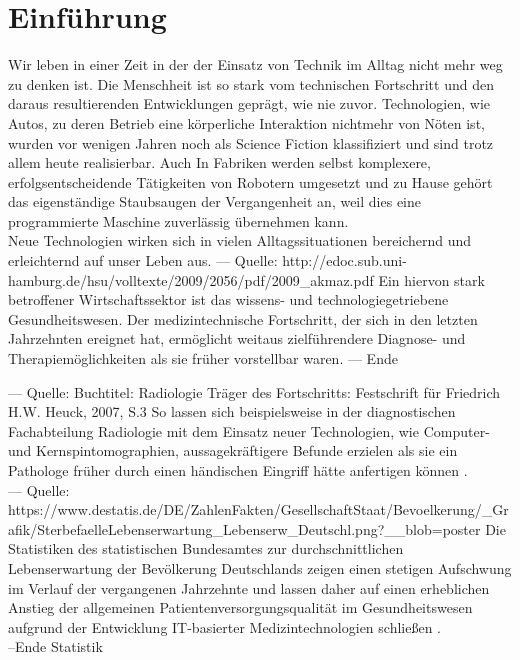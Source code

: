 \chapter{Einführung}
Wir leben in einer Zeit in der der Einsatz von Technik im Alltag nicht mehr weg zu denken ist. Die Menschheit ist so stark vom technischen Fortschritt und den daraus resultierenden Entwicklungen geprägt, wie nie zuvor.  
Technologien, wie Autos, zu deren Betrieb eine körperliche Interaktion nichtmehr von Nöten ist, wurden vor wenigen Jahren noch als Science Fiction klassifiziert und sind trotz allem heute realisierbar.
Auch In Fabriken werden selbst komplexere, erfolgsentscheidende Tätigkeiten von Robotern umgesetzt und zu Hause gehört das eigenständige Staubsaugen der Vergangenheit an, 
weil dies eine programmierte Maschine zuverlässig übernehmen kann. \\
Neue Technologien wirken sich in vielen Alltagssituationen bereichernd und erleichternd auf unser Leben aus. 
--- Quelle: http://edoc.sub.uni-hamburg.de/hsu/volltexte/2009/2056/pdf/2009\_akmaz.pdf
Ein hiervon stark betroffener Wirtschaftssektor ist das wissens- und technologiegetriebene Gesundheitswesen. Der medizintechnische Fortschritt, der sich in den letzten Jahrzehnten ereignet hat, ermöglicht weitaus zielführendere Diagnose- und Therapiemöglichkeiten als sie früher vorstellbar waren.
--- Ende 



--- Quelle: Buchtitel: Radiologie Träger des Fortschritts: Festschrift für Friedrich H.W. Heuck, 2007, S.3
So lassen sich beispielsweise in der diagnostischen Fachabteilung Radiologie mit dem Einsatz neuer Technologien, wie Computer- und Kernspintomographien, aussagekräftigere Befunde erzielen als sie ein Pathologe früher durch einen händischen Eingriff hätte anfertigen können \cite[S.3]{buck_radiologie_2013}.\\

--- Quelle: https://www.destatis.de/DE/ZahlenFakten/GesellschaftStaat/Bevoelkerung/\_Grafik/SterbefaelleLebenserwartung\_Lebenserw\_Deutschl.png?\_\_blob=poster
Die Statistiken des statistischen Bundesamtes zur durchschnittlichen Lebenserwartung der Bevölkerung Deutschlands zeigen einen stetigen Aufschwung im Verlauf der vergangenen Jahrzehnte und lassen daher auf einen erheblichen Anstieg der allgemeinen Patientenversorgungsqualität im Gesundheitswesen aufgrund der Entwicklung IT-basierter Medizintechnologien schließen \cite{_sterbefaellelebenserwartung_lebenserw_deutschl.png_????}.\\ 
--Ende Statistik

